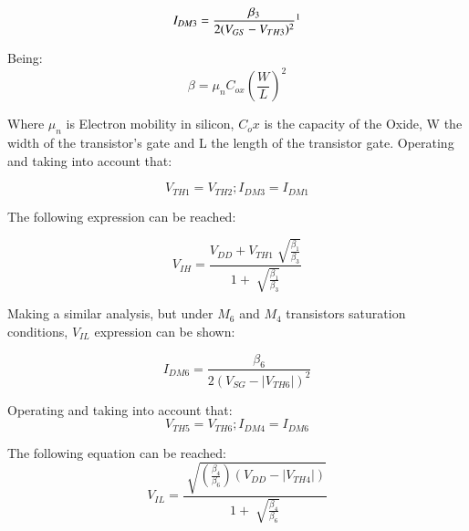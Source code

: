 \documentclass{article} %
\begin{document}
\begin{multicols}{2}
\begin{equation} \label{eq:vref}
{I_{DM3} = \frac{\beta _3}{2(V_{GS}-V_{TH3})^2}}\footnote{{VGS is the voltage between gate and source of the transistor, VTH threshold voltage, and IDM the drain current of the transistor}}
\end{equation}



Being:
\begin{equation} \label{eq:vref}
\beta = \mu _n C_{ox} (\frac{W}{L})^2 
\end{equation}

Where $\mu _n$  is Electron mobility in silicon, $C_ox$ is the capacity of the Oxide, W the width of the transistor’s gate and L the length of the transistor gate.
Operating and taking into account that:

\begin{equation} \label{eq:vref}
V_{TH1} = V_{TH2};  I_{DM3} = I_{DM1}
\end{equation}

The following expression can be reached:

\begin{equation} \label{eq:vref}
V_{IH}= \frac{V_{DD}+V_{TH1}\sqrt[]{\frac{\beta _1}{\beta _3}}}{1+\sqrt[]{\frac{\beta _1}{\beta _3}}}
\end{equation}


Making a similar analysis, but under $M_6$ and $M_4$ transistors saturation conditions, $V_{IL}$ expression can be shown:

\begin{equation} \label{eq:vref}
I_{DM6} = \frac{\beta _6}{2(V_{SG}-|V_{TH6}|)^2}
\end{equation}

Operating and taking into account that:
\begin{equation} \label{eq:vref}
V_{TH5} = V_{TH6};  I_{DM4} = I_{DM6}
\end{equation}

The following equation can be reached:
\begin{equation} \label{eq:vref}
V_{IL}= \frac{\sqrt[]{(\frac{\beta _4}{\beta _6})(V_{DD}-|V_{TH4}|)}}{1+\sqrt[]{\frac{\beta _4}{\beta _6}}}
\end{equation}



\end{multicols}
\end{document}
